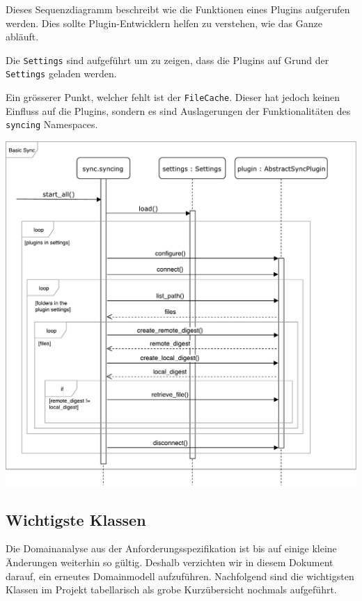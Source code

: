 \documentclass[a4paper]{article}
\begin{document}
Dieses Sequenzdiagramm beschreibt wie die Funktionen eines Plugins aufgerufen werden.
Dies sollte Plugin-Entwicklern helfen zu verstehen, wie das Ganze abläuft.

Die \verb|Settings| sind aufgeführt um zu zeigen, dass die Plugins auf Grund der \verb|Settings| geladen werden.

Ein grösserer Punkt, welcher fehlt ist der \verb|FileCache|.
Dieser hat jedoch keinen Einfluss auf die Plugins, sondern es sind Auslagerungen der Funktionalitäten des \verb|syncing| Namespaces.

\includegraphics[width=40em]{./img/GrobesSequenzDiagramm.pdf}

\subsection{Wichtigste Klassen}

Die Domainanalyse aus der Anforderungsspezifikation ist bis auf einige kleine
Änderungen weiterhin so gültig. Deshalb verzichten wir in diesem Dokument
darauf, ein erneutes Domainmodell aufzuführen. Nachfolgend sind die wichtigsten
Klassen im Projekt tabellarisch als grobe Kurzübersicht nochmals aufgeführt.
\end{document}
